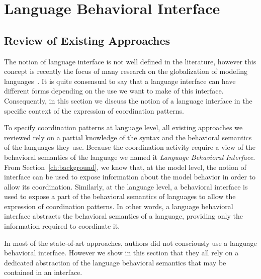 \section{Language Behavioral Interface}
\subsection{Review of Existing Approaches}

The notion of language interface is not well defined in the literature, however this concept is recently the focus of many research on the globalization of modeling languages~\cite{GML_ch1, GML_ch3, GML_ch4, TdegeuleSLE}. It is quite consensual to say that a language interface can have different forms depending on the use we want to make of this interface. Consequently, in this section we discuss the notion of a language interface in the specific context of the expression of coordination patterns. 

To specify coordination patterns at language level, all existing approaches we reviewed rely on a partial knowledge of the syntax and the behavioral semantics of the languages they use. Because the coordination activity require a view of the behavioral semantics of the language we named it \emph{Language Behavioral Interface}. From Section~\ref{ch:background}, we know that, at the model level, the notion of interface can be used to expose information about the model behavior in order to allow its coordination. Similarly, at the language level, a behavioral interface is used to expose a part of the behavioral semantics of languages to allow the expression of coordination patterns. In other words, a language behavioral interface abstracts the behavioral semantics of a language, providing only the information required to coordinate it. 


In most of the state-of-art approaches, authors did not consciously use a language behavioral interface. However we show in this section that they all rely on a dedicated abstraction of the language behavioral semantics that may be contained in an interface. 

